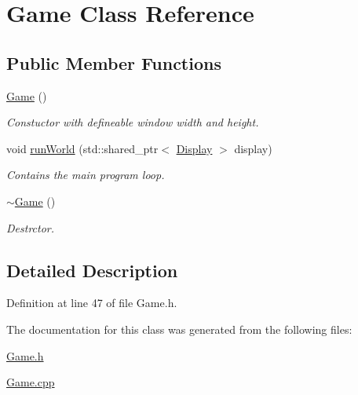 \hypertarget{class_game}{\section{Game Class Reference}
\label{class_game}
}
\subsection*{Public Member Functions}
\begin{DoxyCompactItemize}
\item 
\hypertarget{class_game_ad59df6562a58a614fda24622d3715b65}{\hyperlink{class_game_ad59df6562a58a614fda24622d3715b65}{Game} ()}\label{class_game_ad59df6562a58a614fda24622d3715b65}

\begin{DoxyCompactList}\small\item\em Constuctor with defineable window width and height. \end{DoxyCompactList}\item 
\hypertarget{class_game_a6073fbea287e3bd28ae5eaf350559448}{void \hyperlink{class_game_a6073fbea287e3bd28ae5eaf350559448}{run\+World} (std\+::shared\+\_\+ptr$<$ \hyperlink{class_display}{Display} $>$ display)}\label{class_game_a6073fbea287e3bd28ae5eaf350559448}

\begin{DoxyCompactList}\small\item\em Contains the main program loop. \end{DoxyCompactList}\item 
\hypertarget{class_game_ae3d112ca6e0e55150d2fdbc704474530}{\hyperlink{class_game_ae3d112ca6e0e55150d2fdbc704474530}{$\sim$\+Game} ()}\label{class_game_ae3d112ca6e0e55150d2fdbc704474530}

\begin{DoxyCompactList}\small\item\em Destrctor. \end{DoxyCompactList}\end{DoxyCompactItemize}


\subsection{Detailed Description}


Definition at line 47 of file Game.\+h.



The documentation for this class was generated from the following files\+:\begin{DoxyCompactItemize}
\item 
\hyperlink{_game_8h}{Game.\+h}\item 
\hyperlink{_game_8cpp}{Game.\+cpp}\end{DoxyCompactItemize}
